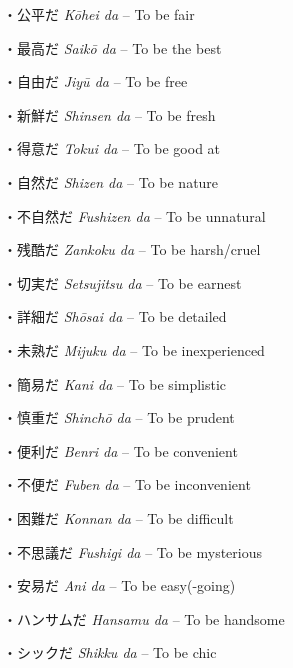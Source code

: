 \par{・公平だ \emph{Kōhei da }– To be fair }
 
\par{・最高だ \emph{Saikō da }– To be the best }
 
\par{・自由だ \emph{Jiyū da }– To be free }
 
\par{・新鮮だ \emph{Shinsen da }– To be fresh }
 
\par{・得意だ \emph{Tokui da }– To be good at }
 
\par{・自然だ \emph{Shizen da }– To be nature }
 
\par{・不自然だ \emph{Fushizen da }– To be unnatural }
 
\par{・残酷だ \emph{Zankoku da }– To be harsh\slash cruel }
 
\par{・切実だ \emph{Setsujitsu da }– To be earnest }
 
\par{・詳細だ \emph{Shōsai da }– To be detailed }
 
\par{・未熟だ \emph{Mijuku da }– To be inexperienced }
 
\par{・簡易だ \emph{Kan\textquotesingle i da }– To be simplistic }
 
\par{・慎重だ \emph{Shinchō da }– To be prudent }
 
\par{・便利だ \emph{Benri da }– To be convenient }
 
\par{・不便だ \emph{Fuben da }– To be inconvenient }
 
\par{・困難だ \emph{Kon\textquotesingle nan da }– To be difficult }
 
\par{・不思議だ \emph{Fushigi da }– To be mysterious }
 
\par{・安易だ \emph{An\textquotesingle i da }– To be easy(-going) }

\par{・ハンサムだ \emph{Hansamu da }– To be handsome }

\par{・シックだ \emph{Shikku da }– To be chic }
       
